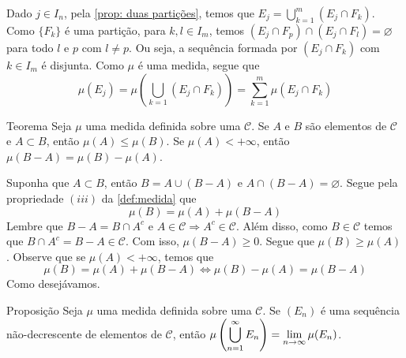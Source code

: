 \begin{prova}
	Dado $j \in I_n$, pela \ref{prop: duas partições}, temos que
	$E_j = \displaystyle \bigcup_{k = 1}^m (E_j\cap F_k)$.
	Como $\{F_k\}$ é uma partição, para $k,l \in I_m$, temos
	$(E_j\cap F_p) \cap (E_j\cap F_l) = \varnothing$ para todo $l$ e $p$ com  $l \neq p$.
	Ou seja, a sequência formada por $(E_j\cap F_k)$ com $k \in I_m$ é disjunta.
	Como $\mu$ é uma medida, segue que
	$$
	\mu(E_j)
	=
	\mu\left(\bigcup_{k = 1} (E_j\cap F_k)\right)
	=
	\sum_{k = 1}^{m}\mu(E_j\cap F_k)
	$$
	\vspace{-1cm}
\end{prova}
\begin{env}{Teorema}
\label{teo:medida-diferença}
	Seja $\mu$ uma medida definida sobre uma \sigal $\mathcal{C}$.
	Se $A$ e $B$ são elementos de $\mathcal{C}$ e $A \subset B$, então $\mu(A) \leq \mu(B)$.
	Se $\mu(A) < +\infty$, então $\mu(B-A) = \mu(B) - \mu(A)$.
\end{env}
\begin{prova}
	Suponha que $A \subset B$, então $B = A \cup (B - A)$ e $A \cap (B - A) = \varnothing$. Segue pela propriedade $(iii)$ da \ref{def:medida} que 
	$$\mu(B) = \mu(A) + \mu(B-A)$$
	Lembre que $B-A = B\cap A^c$ e $A \in \mathcal{C} \Rightarrow A^c \in \mathcal{C}$.
	Além disso, como $B \in \mathcal{C}$ temos que $ B\cap A^c = B - A \in \mathcal{C}$.
	Com isso, $\mu(B-A) \geq 0$.
	Segue que $\mu(B) \geq \mu(A)$.
	Observe que se $\mu(A) < +\infty$, temos que 
	$$\mu(B) = \mu(A) + \mu(B-A) 
	 \Leftrightarrow \mu(B) - \mu(A) =  \mu(B-A)
 	$$
Como desejávamos.
\end{prova}

\begin{env}{Proposição}
\label{prop:limite-sequencia-crescente}
Seja $\mu$ uma medida definida sobre uma \sigal $\mathcal{C}$.
Se $(E_n)$ é uma sequência não-decrescente de elementos de $\mathcal{C}$, então $\mu\left(\displaystyle \bigcup_{n = 1}^\infty E_n\right) = \displaystyle \lim_{n \to \infty} \mu(E_n)$.
\end{env} 


